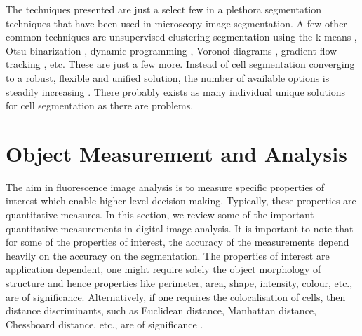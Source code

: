 \begin{definition}
	The techniques presented are just a select few in a plethora segmentation techniques that have been used in microscopy image segmentation.
	A few other common techniques are unsupervised clustering segmentation using the k-means \citep{Ng2006,Shrivastava2014,Dhanachandra2015}, Otsu binarization \citep{Chen2006}, dynamic programming \citep{Liu2007,Zhang2007}, Voronoi diagrams \citep{Cardenes2003,Jiang2005}, gradient flow tracking \citep{Li2007}, etc.
	These are just a few more.
	Instead of cell segmentation converging to a robust, flexible and unified solution, the number of available options is steadily increasing \citep{Meijering2012}.
	There probably exists as many individual unique solutions for cell segmentation as there are problems.
\end{definition}


\section{Object Measurement and Analysis}
\label{sec:Measurements}

The aim in fluorescence image analysis is to measure specific properties of interest which enable higher level decision making.
Typically, these properties are quantitative measures.
In this section, we review some of the important quantitative measurements in digital image analysis.
It is important to note that for some of the properties of interest, the accuracy of the measurements depend heavily on the accuracy on the segmentation.
The properties of interest are application dependent, one might require solely the object morphology of structure and hence properties like perimeter, area, shape, intensity, colour, etc., are of significance.
Alternatively, if one requires the colocalisation of cells, then distance discriminants, such as Euclidean distance, Manhattan distance, Chessboard distance, etc., are of significance \citep{Fatima2008_2,Danek2012}.

